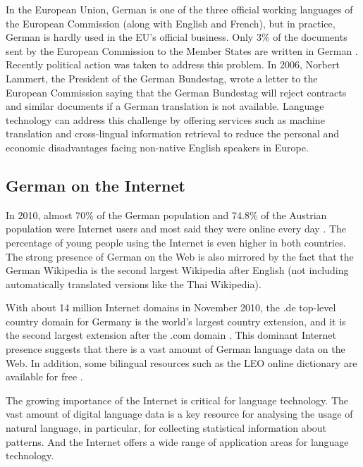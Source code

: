 \documentclass[]{../../metanetpaper}
\begin{document}
\begin{multicols}{2}

In the European Union, German is one of the three official working languages of the European Commission (along with English and French), but in practice, German is hardly used in the EU’s official business. Only 3\% of the documents sent by the European Commission to the Member States are written in German \cite{joy1}. Recently political action was taken to address this problem. In 2006, Norbert Lammert, the President of the German Bundestag, wrote a letter to the European Commission saying that the German Bundestag will reject contracts and similar documents if a German translation is not available. Language technology can address this challenge by offering services such as machine translation and cross-lingual information retrieval to reduce the personal and economic disadvantages facing non-native English speakers in Europe.

\subsection{German on the Internet}

In 2010, almost 70\% of the German population and 74.8\% of the Austrian population were Internet users and most said they were online every day \cite{ard1,ict1}. The percentage of young people using the Internet is even higher in both countries. The strong presence of German on the Web is also mirrored by the fact that the German Wikipedia is the second largest Wikipedia after English (not including automatically translated versions like the Thai Wikipedia).


With about 14 million Internet domains in November 2010, the .de top-level country domain for Germany is the world’s largest country extension, and it is the second largest extension after the .com domain \cite{denic1,ebrands1}. This dominant Internet presence suggests that there is a vast amount of German language data on the Web. In addition, some bilingual resources such as the LEO online dictionary are available for free \cite{leo1}.


The growing importance of the Internet is critical for language technology. The vast amount of digital language data is a key resource for analysing the usage of natural language, in particular, for collecting statistical information about patterns. And the Internet offers a wide range of application areas for language technology. 


\end{multicols}
\end{document}
